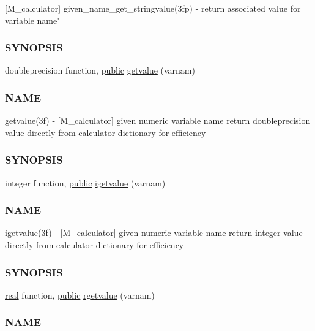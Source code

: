 \begin{DoxyCompactItemize}
\begin{DoxyCompactList}
\mbox{[}M\+\_\+calculator\mbox{]} given\+\_\+name\+\_\+get\+\_\+stringvalue(3fp) -\/ return associated value for variable name" \subsubsection*{S\+Y\+N\+O\+P\+S\+IS}\end{DoxyCompactList}\item 
doubleprecision function, \hyperlink{M__stopwatch_83_8txt_a2f74811300c361e53b430611a7d1769f}{public} \hyperlink{namespacem__calculator_ab8fa4f20b1e4db1b10ed4deb52b89b34}{getvalue} (varnam)
\begin{DoxyCompactList}\small\item\em \subsubsection*{N\+A\+ME}

getvalue(3f) -\/ \mbox{[}M\+\_\+calculator\mbox{]} given numeric variable name return doubleprecision value directly from calculator dictionary for efficiency \subsubsection*{S\+Y\+N\+O\+P\+S\+IS}\end{DoxyCompactList}\item 
integer function, \hyperlink{M__stopwatch_83_8txt_a2f74811300c361e53b430611a7d1769f}{public} \hyperlink{namespacem__calculator_a192c846b6a8d40ddfe603f988ff82381}{igetvalue} (varnam)
\begin{DoxyCompactList}\small\item\em \subsubsection*{N\+A\+ME}

igetvalue(3f) -\/ \mbox{[}M\+\_\+calculator\mbox{]} given numeric variable name return integer value directly from calculator dictionary for efficiency \subsubsection*{S\+Y\+N\+O\+P\+S\+IS}\end{DoxyCompactList}\item 
\hyperlink{read__watch_83_8txt_abdb62bde002f38ef75f810d3a905a823}{real} function, \hyperlink{M__stopwatch_83_8txt_a2f74811300c361e53b430611a7d1769f}{public} \hyperlink{namespacem__calculator_af8d4bcc1789a047303ac7061c2a504e8}{rgetvalue} (varnam)
\begin{DoxyCompactList}\small\item\em \subsubsection*{N\+A\+ME}


\end{DoxyCompactList}
\end{DoxyCompactItemize}
